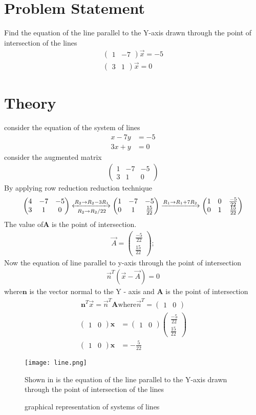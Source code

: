 \documentclass{article}
\renewcommand{\vec}[1]{\mathbf{#1}}
\newcommand{\myvec}[1]{\ensuremath{\begin{pmatrix}#1\end{pmatrix}}}
\begin{document}
\section{Problem Statement}
Find the equation of the line parallel to the Y-axis drawn through the point of intersection of the lines
\begin{align}
\myvec{1 & -7}\Vec{x}  =-5 \\ \myvec{3 & 1}\Vec{x}= 0
\end{align}
\section{Theory}
consider the equation of the system of lines
\begin{align}
x - 7y & = -5 \\
3x + y & = 0
\end{align}
 consider the augmented matrix
 \begin{align}
 \myvec{1 & -7 & -5 \\ 3 & 1 & 0}
 \end{align}
 By applying row reduction reduction technique 
 \begin{align}
\myvec{4 & -7 & -5\\ 3 & 1 & 0}
	\xleftrightarrow[R_2 \rightarrow R_2/22]{R_2 \rightarrow R_2-3R_1}
	\myvec{1 & -7 & -5 \\ 0 & 1 & \frac{15}{22}}
	\xrightarrow[]{R_1 \rightarrow R_1+7R_2}
	 \myvec{1 & 0 & \frac{-5}{22} \\ 0 & 1 & \frac{15}{22}}
 \end{align}
 The value of$\vec{A}$ is the point of intersection.
\begin{align}
 {\Vec{A}} = \myvec{\frac{-5}{22} \\ \frac{15}{22}} ;
\end{align}
Now the equation of line parallel to y-axis through the point of intersection
\begin{align}
\Vec{n}^T(\Vec{x}-\Vec{A}) = 0
\end{align}
where$\vec{n}$ is the vector normal to the Y - axis and $\vec{A}$ is the point of intersection
\begin{align}
\vec{n}^T \Vec{x} = \Vec{n}^T\vec{A}\text{where}
 \Vec{n}^T = \myvec{1 & 0}
 \end{align}
 \begin{align}
\myvec{1 & 0}\vec{x} &  = \myvec{1 & 0} \myvec{\frac{-5}{22} \\ \frac{15}{22}}\\
\myvec{1 & 0}\vec{x} & = -\frac{5}{22}
 \end{align}
 \begin{figure}
 \centering
 \texttt{[image: line.png]}
 \caption{graphical representation of systems of lines}
 \label{fig:lines}
 Shown in  is the equation of the line parallel to the Y-axis drawn through the point of intersection of the lines 
 \end{figure}
\end{document}
